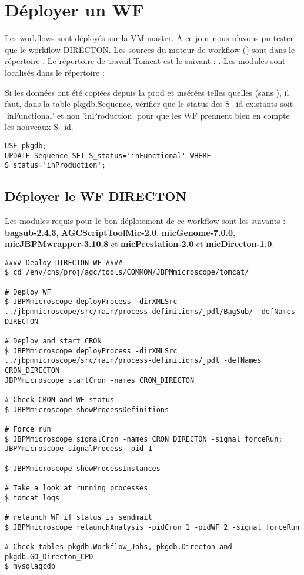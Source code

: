 \section{Déployer un WF}

Les workflows sont déployés sur la VM master.
À ce jour nous n'avons pu tester que le workflow DIRECTON.
Les sources du moteur de workflow () sont dans le répertoire .
Le répertoire de travail Tomcat est le suivant : .
Les modules sont localisés dans le répertoire : 
\newline

\begin{mycolorbox}
    Si les données ont été copiées depuis la prod et insérées telles quelles (sans ), il faut, dans la table pkgdb.Sequence, vérifier que le status des S\_id existants soit 'inFunctional' et non 'inProduction' pour que les WF prennent bien en compte les nouveaux S\_id.
\end{mycolorbox}

\begin{lstlisting}[style=SQL]
USE pkgdb;
UPDATE Sequence SET S_status='inFunctional' WHERE S_status='inProduction';
\end{lstlisting}

\subsection{Déployer le WF DIRECTON}
Les modules requis pour le bon déploiement de ce workflow sont les suivants : \textbf{bagsub-2.4.3}, \textbf{AGCScriptToolMic-2.0}, \textbf{micGenome-7.0.0}, \textbf{micJBPMwrapper-3.10.8} et \textbf{micPrestation-2.0} et \textbf{micDirecton-1.0}.

\begin{lstlisting}[style=bash]
#### Deploy DIRECTON WF ####
$ cd /env/cns/proj/agc/tools/COMMON/JBPMmicroscope/tomcat/

# Deploy WF
$ JBPMmicroscope deployProcess -dirXMLSrc ../jbpmmicroscope/src/main/process-definitions/jpdl/BagSub/ -defNames DIRECTON

# Deploy and start CRON
$ JBPMmicroscope deployProcess -dirXMLSrc ../jbpmmicroscope/src/main/process-definitions/jpdl -defNames CRON_DIRECTON
JBPMmicroscope startCron -names CRON_DIRECTON

# Check CRON and WF status
$ JBPMmicroscope showProcessDefinitions

# Force run
$ JBPMmicroscope signalCron -names CRON_DIRECTON -signal forceRun; JBPMmicroscope signalProcess -pid 1

$ JBPMmicroscope showProcessInstances

# Take a look at running processes
$ tomcat_logs

# relaunch WF if status is sendmail
$ JBPMmicroscope relaunchAnalysis -pidCron 1 -pidWF 2 -signal forceRun

# Check tables pkgdb.Workflow_Jobs, pkgdb.Directon and pkgdb.GO_Directon_CPD
$ mysqlagcdb
\end{lstlisting}
